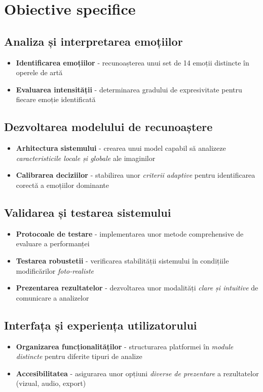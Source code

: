 \section{Obiective specifice}
\label{sec:obiective-specifice}

\subsection{Analiza și interpretarea emoțiilor}
\begin{itemize}
  \item \textbf{Identificarea emoțiilor} - recunoașterea unui set de 14 emoții distincte în operele de artă
  \item \textbf{Evaluarea intensității} - determinarea gradului de expresivitate pentru fiecare emoție identificată
\end{itemize}

\subsection{Dezvoltarea modelului de recunoaștere}
\begin{itemize}
  \item \textbf{Arhitectura sistemului} - crearea unui model capabil să analizeze \emph{caracteristicile locale și globale} ale imaginilor
  \item \textbf{Calibrarea deciziilor} - stabilirea unor \textit{criterii adaptive} pentru identificarea corectă a emoțiilor dominante
\end{itemize}

\subsection{Validarea și testarea sistemului}
\begin{itemize}
  \item \textbf{Protocoale de testare} - implementarea unor metode comprehensive de evaluare a performanței
  \item \textbf{Testarea robustetii} - verificarea stabilității sistemului în condițiile modificărilor \emph{foto-realiste}
  \item \textbf{Prezentarea rezultatelor} - dezvoltarea unor modalități \textit{clare și intuitive} de comunicare a analizelor
\end{itemize}

\subsection{Interfața și experiența utilizatorului}
\begin{itemize}
  \item \textbf{Organizarea funcționalităților} - structurarea platformei în \emph{module distincte} pentru diferite tipuri de analize
  \item \textbf{Accesibilitatea} - asigurarea unor opțiuni \textit{diverse de prezentare} a rezultatelor (vizual, audio, export)
\end{itemize}

